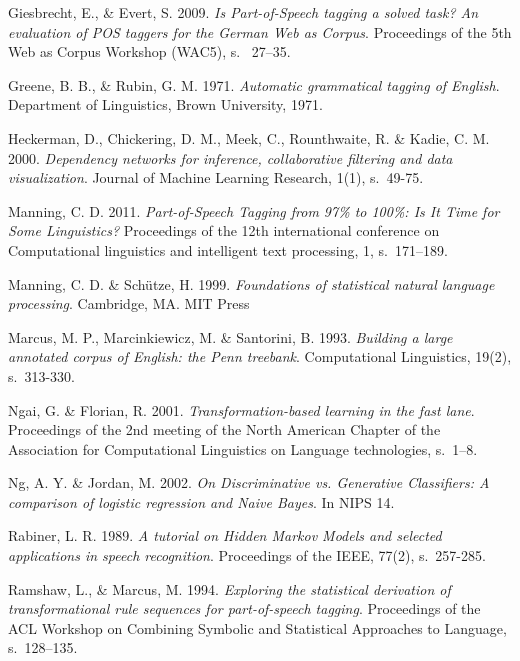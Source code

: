 \documentclass[utf8,bachelor,manualbib]{gradu3}
\begin{document}
\begin{thebibliography}{}
Giesbrecht, E., \& Evert, S. 2009. \textit{Is Part-of-Speech tagging a solved task? An evaluation of POS taggers for the German Web as Corpus}. Proceedings of the 5th Web as Corpus Workshop (WAC5), s.~ 27--35.

Greene, B. B., \& Rubin, G. M. 1971. \textit{Automatic grammatical tagging of English}. Department of Linguistics, Brown University, 1971.

Heckerman, D., Chickering, D. M., Meek, C., Rounthwaite, R. \& Kadie, C. M. 2000. \textit{Dependency networks for inference, collaborative filtering and data visualization}.
Journal of Machine Learning Research, 1(1), s.~49-75.

Manning, C. D. 2011. \textit{Part-of-Speech Tagging from 97\% to 100\%: Is It Time for Some Linguistics?} Proceedings of the 12th international conference on Computational linguistics and intelligent text processing, 1, s.~171--189.

Manning, C. D. \& Sch\"{u}tze, H. 1999. \textit{Foundations of statistical natural language processing}.
Cambridge, MA. MIT Press

Marcus, M. P., Marcinkiewicz, M. \& Santorini, B. 1993. \textit{Building a large annotated corpus of English: the Penn treebank}. Computational Linguistics, 19(2), s.~313-330.

Ngai, G. \& Florian, R. 2001. \textit{Transformation-based learning in the fast lane}. Proceedings of the 2nd meeting of the North American Chapter of the Association for Computational Linguistics on Language technologies, s.~1--8.

Ng, A. Y. \& Jordan, M. 2002. \textit{On Discriminative vs. Generative Classifiers: A comparison of logistic regression and Naive Bayes}. In NIPS 14.

Rabiner, L. R. 1989. \textit{A tutorial on Hidden Markov Models and selected applications in speech recognition}. Proceedings of the IEEE, 77(2), s.~257-285.

Ramshaw, L., \& Marcus, M. 1994. \textit{Exploring the statistical derivation of transformational rule sequences for part-of-speech tagging}. Proceedings of the ACL Workshop on Combining Symbolic and Statistical Approaches to Language, s.~128--135.


\end{thebibliography}
\end{document}
